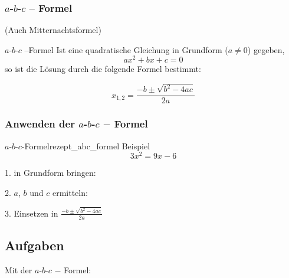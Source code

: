 \subsubsection{$a$-$b$-$c$ -- Formel}
(Auch Mitternachtsformel)



\begin{gesetz}{$a$-$b$-$c$ --Formel}{}
Ist eine quadratische Gleichung in Grundform ($a\ne 0$) gegeben,
$$ax^2 + bx + c = 0$$
so ist die Lösung durch die folgende Formel bestimmt:

$$x_{1,2}=\frac{-b\pm\sqrt{b^2-4ac}}{2a}$$
\end{gesetz}
\newpage


\subsubsection{Anwenden der $a$-$b$-$c$ $-$ Formel}
\begin{rezept}{$a$-$b$-$c$-Formel}{rezept_abc_formel}
  Beispiel $$3x^2 = 9x - 6$$

  1. in Grundform bringen: 


2. $a$, $b$ und $c$ ermitteln:


3. Einsetzen in \large{ $\frac{-b \pm \sqrt{b^2-4ac}}{2a}$}

\end{rezept}

\subsection*{Aufgaben}
Mit der $a$-$b$-$c$ $-$ Formel:
\newpage

